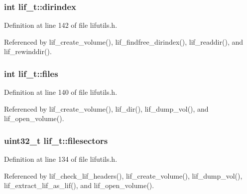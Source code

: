 \subsubsection[{\texorpdfstring{dirindex}{dirindex}}]{\setlength{\rightskip}{0pt plus 5cm}int lif\+\_\+t\+::dirindex}\hypertarget{structlif__t_a74f8af3dc203c3c6b9dea3829bb4b6fa}{}\label{structlif__t_a74f8af3dc203c3c6b9dea3829bb4b6fa}


Definition at line 142 of file lifutils.\+h.



Referenced by lif\+\_\+create\+\_\+volume(), lif\+\_\+findfree\+\_\+dirindex(), lif\+\_\+readdir(), and lif\+\_\+rewinddir().

\subsubsection[{\texorpdfstring{files}{files}}]{\setlength{\rightskip}{0pt plus 5cm}int lif\+\_\+t\+::files}\hypertarget{structlif__t_aceca398e2e3f6bcffe1593969544d546}{}\label{structlif__t_aceca398e2e3f6bcffe1593969544d546}


Definition at line 140 of file lifutils.\+h.



Referenced by lif\+\_\+create\+\_\+volume(), lif\+\_\+dir(), lif\+\_\+dump\+\_\+vol(), and lif\+\_\+open\+\_\+volume().

\subsubsection[{\texorpdfstring{filesectors}{filesectors}}]{\setlength{\rightskip}{0pt plus 5cm}uint32\+\_\+t lif\+\_\+t\+::filesectors}\hypertarget{structlif__t_a1223702cce63f879654d51773243643d}{}\label{structlif__t_a1223702cce63f879654d51773243643d}


Definition at line 134 of file lifutils.\+h.



Referenced by lif\+\_\+check\+\_\+lif\+\_\+headers(), lif\+\_\+create\+\_\+volume(), lif\+\_\+dump\+\_\+vol(), lif\+\_\+extract\+\_\+lif\+\_\+as\+\_\+lif(), and lif\+\_\+open\+\_\+volume().

